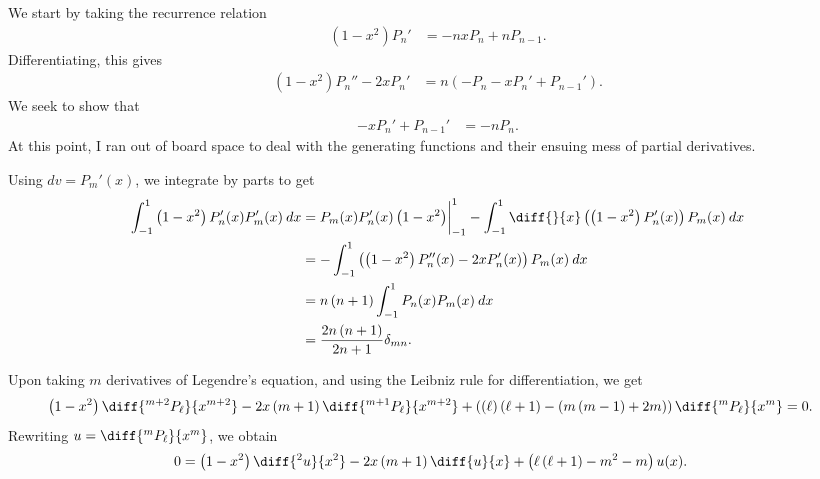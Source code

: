 \documentclass[10pt]{mypackage}
\begin{document}
\RaggedRight
\begin{solution}[32.20]
  We start by taking the recurrence relation
  \begin{align*}
    \left( 1-x^2 \right)P_n' &= -nxP_n + nP_{n-1}.\label{eq:derivative_recursion}\tag{$\ast$}
  \end{align*}
  Differentiating, this gives
  \begin{align*}
    \left( 1-x^2 \right)P_n'' - 2xP_n' &= n\left( -P_n - xP_n' + P_{n-1}' \right). 
  \end{align*}
  We seek to show that
  \begin{align*}
    -xP_n' + P_{n-1}' &= -nP_n.
  \end{align*}
  At this point, I ran out of board space to deal with the generating functions and their ensuing mess of partial derivatives.
\end{solution}
\begin{solution}[32.21]
  Using $dv=P_m'(x)$, we integrate by parts to get
  \begin{align*}
    \int_{-1}^{1} \left( 1-x^2 \right)P_n'(x)P_m'(x)\:dx &= P_m(x)P_n'(x)\left( 1-x^2 \right)\biggr\vert_{-1}^{1} - \int_{-1}^{1} \diff{}{x}\left( \left( 1-x^2 \right)P_n'(x) \right)P_m(x)\:dx\\
                                                         &= - \int_{-1}^{1} \left( \left( 1-x^2 \right)P_n''(x) - 2xP_n'(x) \right)P_{m}(x)\:dx\\
                                                         &= n\left( n+1 \right) \int_{-1}^{1} P_n(x)P_m(x)\:dx\\
                                                         &= \frac{2n\left( n+1 \right)}{2n+1} \delta_{mn}.
  \end{align*}
\end{solution}
\begin{solution}[32.23]
  Upon taking $m$ derivatives of Legendre's equation, and using the Leibniz rule for differentiation, we get
  \begin{align*}
    \left( 1-x^2 \right)\diff{^{m+2}P_{\ell}}{x^{m+2}} - 2x\left( m+1 \right)\diff{^{m+1}P_{\ell}}{x^{m+2}} + \left( \left( \ell \right)\left( \ell + 1 \right) - \left( m\left( m-1 \right) + 2m \right) \right)\diff{^{m}P_{\ell}}{x^{m}} &= 0.
  \end{align*}
  Rewriting $u = \diff{^mP_{\ell}}{x^{m}}$, we obtain
  \begin{align*}
    0 &= \left( 1-x^2 \right)\diff{^2u}{x^2} -2x\left( m+1 \right)\diff{u}{x} + \left( \ell\left( \ell + 1 \right)-m^2-m \right)u(x).
  \end{align*}

\end{solution}
\end{document}
